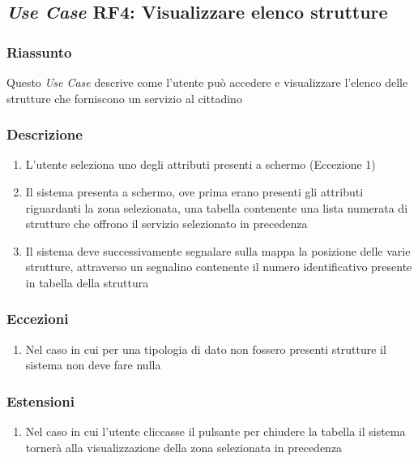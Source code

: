     \subsection{\textit{Use Case} RF4: Visualizzare elenco strutture}
        \subsubsection{Riassunto}
            Questo \textit{Use Case} descrive come l'utente può accedere e visualizzare l'elenco delle strutture che forniscono un servizio al cittadino
        \subsubsection{Descrizione}
            \begin{enumerate}
                \item L'utente seleziona uno degli attributi presenti a schermo (Eccezione 1)
                \item Il sistema presenta a schermo, ove prima erano presenti gli attributi riguardanti la zona selezionata, una tabella contenente una lista numerata di strutture che offrono il servizio selezionato in precedenza
                \item Il sistema deve successivamente segnalare sulla mappa la posizione delle varie strutture, attraverso un segnalino contenente il numero identificativo presente in tabella della struttura
            \end{enumerate}
        \subsubsection{Eccezioni}
            \begin{enumerate}
                \item Nel caso in cui per una tipologia di dato non fossero presenti strutture il sistema non deve fare nulla
            \end{enumerate}
        \subsubsection{Estensioni}
            \begin{enumerate}
                \item Nel caso in cui l'utente cliccasse il pulsante per chiudere la tabella il sistema tornerà alla visualizzazione della zona selezionata in precedenza
            \end{enumerate}

